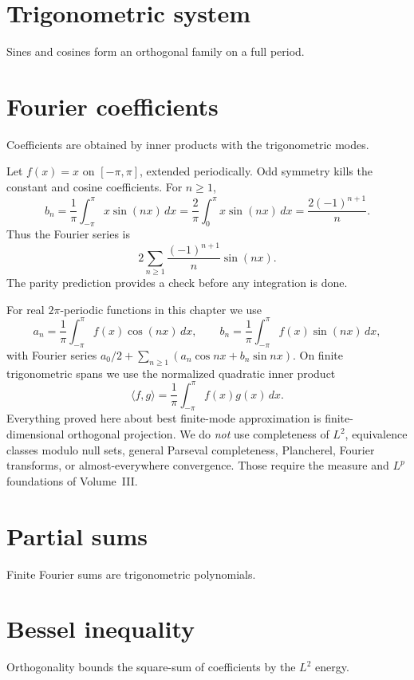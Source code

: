 \section{Trigonometric system}
Sines and cosines form an orthogonal family on a full period.

\section{Fourier coefficients}
Coefficients are obtained by inner products with the trigonometric modes.


\begin{example}\label{ex:ii14-expand-01}
Let \(f(x)=x\) on \([-\pi,\pi]\), extended periodically. Odd symmetry kills the
constant and cosine coefficients. For \(n\ge1\),
\[
b_n=\frac1\pi\int_{-\pi}^{\pi}x\sin(nx)\,dx
=\frac{2}{\pi}\int_0^\pi x\sin(nx)\,dx
=\frac{2(-1)^{n+1}}{n}.
\]
Thus the Fourier series is
\[
2\sum_{n\ge1}\frac{(-1)^{n+1}}{n}\sin(nx).
\]
The parity prediction provides a check before any integration is done.
\end{example}
\begin{remark}
For real $2\pi$-periodic functions in this chapter we use
\[
a_n=\frac1\pi\int_{-\pi}^{\pi}f(x)\cos(nx)\,dx,
\qquad
b_n=\frac1\pi\int_{-\pi}^{\pi}f(x)\sin(nx)\,dx,
\]
with Fourier series $a_0/2+\sum_{n\ge1}(a_n\cos nx+b_n\sin nx)$. On finite trigonometric spans we use the normalized quadratic inner product
\[
\langle f,g\rangle=\frac1\pi\int_{-\pi}^{\pi}f(x)g(x)\,dx.
\]
Everything proved here about best finite-mode approximation is finite-dimensional orthogonal projection. We do \emph{not} use completeness of $L^2$, equivalence classes modulo null sets, general Parseval completeness, Plancherel, Fourier transforms, or almost-everywhere convergence. Those require the measure and $L^p$ foundations of Volume~III.
\end{remark}

\section{Partial sums}
Finite Fourier sums are trigonometric polynomials.

\section{Bessel inequality}
Orthogonality bounds the square-sum of coefficients by the $L^2$ energy.

